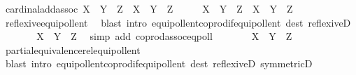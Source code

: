 \begin{isabellebody}
\isanewline
{}\isamarkupfalse%
\ cardinal{\isacharunderscore}{\kern0pt}add{\isacharunderscore}{\kern0pt}assoc{\isacharcolon}{\kern0pt}\ {\isachardoublequoteopen}{\isacharparenleft}{\kern0pt}X\ {\isasymoplus}\ Y{\isacharparenright}{\kern0pt}\ {\isasymoplus}\ Z\ {\isacharequal}{\kern0pt}\ X\ {\isasymoplus}\ {\isacharparenleft}{\kern0pt}Y\ {\isasymoplus}\ Z{\isacharparenright}{\kern0pt}{\isachardoublequoteclose}\isanewline
%
\isadelimproof
%
\endisadelimproof
%
\isatagproof
{}\isamarkupfalse%
\ {\isacharminus}{\kern0pt}\isanewline
\ \ \isamarkupfalse%
\ {\isachardoublequoteopen}{\isacharbar}{\kern0pt}{\isacharparenleft}{\kern0pt}X\ {\isasymCoprod}\ Y{\isacharparenright}{\kern0pt}{\isacharbar}{\kern0pt}\ {\isasymCoprod}\ Z\ {\isasymapprox}\ {\isacharparenleft}{\kern0pt}X\ {\isasymCoprod}\ Y{\isacharparenright}{\kern0pt}\ {\isasymCoprod}\ Z{\isachardoublequoteclose}\isanewline
\ \ \ \ \isamarkupfalse%
\ reflexive{\isacharunderscore}{\kern0pt}equipollent\ \isamarkupfalse%
\ {\isacharparenleft}{\kern0pt}blast\ intro{\isacharcolon}{\kern0pt}\ equipollent{\isacharunderscore}{\kern0pt}coprod{\isacharunderscore}{\kern0pt}if{\isacharunderscore}{\kern0pt}equipollent\ dest{\isacharcolon}{\kern0pt}\ reflexiveD{\isacharparenright}{\kern0pt}\isanewline
\ \ \isamarkupfalse%
\ \isamarkupfalse%
\ {\isachardoublequoteopen}{\isachardot}{\kern0pt}{\isachardot}{\kern0pt}{\isachardot}{\kern0pt}\ {\isasymapprox}\ X\ {\isasymCoprod}\ {\isacharparenleft}{\kern0pt}Y\ {\isasymCoprod}\ Z{\isacharparenright}{\kern0pt}{\isachardoublequoteclose}\ \isamarkupfalse%
\ {\isacharparenleft}{\kern0pt}simp\ add{\isacharcolon}{\kern0pt}\ coprod{\isacharunderscore}{\kern0pt}assoc{\isacharunderscore}{\kern0pt}eqpoll{\isacharparenright}{\kern0pt}\isanewline
\ \ \isamarkupfalse%
\ \isamarkupfalse%
\ {\isachardoublequoteopen}{\isachardot}{\kern0pt}{\isachardot}{\kern0pt}{\isachardot}{\kern0pt}\ {\isasymapprox}\ X\ {\isasymCoprod}\ {\isacharbar}{\kern0pt}Y\ {\isasymCoprod}\ Z{\isacharbar}{\kern0pt}{\isachardoublequoteclose}\isanewline
\ \ \ \ \isamarkupfalse%
\ partial{\isacharunderscore}{\kern0pt}equivalence{\isacharunderscore}{\kern0pt}rel{\isacharunderscore}{\kern0pt}equipollent\isanewline
\ \ \ \ \isamarkupfalse%
\ {\isacharparenleft}{\kern0pt}blast\ intro{\isacharcolon}{\kern0pt}\ equipollent{\isacharunderscore}{\kern0pt}coprod{\isacharunderscore}{\kern0pt}if{\isacharunderscore}{\kern0pt}equipollent\ dest{\isacharcolon}{\kern0pt}\ reflexiveD\ symmetricD{\isacharparenright}{\kern0pt}\isanewline

\end{isabellebody}
